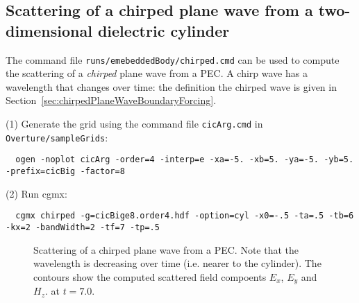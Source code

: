 \clearpage
\subsection{Scattering of a chirped plane wave from a two-dimensional dielectric cylinder} \label{sec:cyl2dDielectricScatChirped}

The command file {\tt runs/emebeddedBody/chirped.cmd} can be used to compute the scattering
of a {\em chirped} plane wave from a PEC. 
A chirp wave has a wavelength that changes over time: 
the definition the chirped wave is given in Section~\ref{sec:chirpedPlaneWaveBoundaryForcing}.


\noindent (1) Generate the grid using the command file {\tt cicArg.cmd} in {\tt Overture/sampleGrids}:
{\small
\begin{verbatim}
  ogen -noplot cicArg -order=4 -interp=e -xa=-5. -xb=5. -ya=-5. -yb=5. -prefix=cicBig -factor=8
\end{verbatim}
}
\noindent (2) Run cgmx: 
{\small
\begin{verbatim}
  cgmx chirped -g=cicBige8.order4.hdf -option=cyl -x0=-.5 -ta=.5 -tb=6 -kx=2 -bandWidth=2 -tf=7 -tp=.5
\end{verbatim}
}

{
\begin{figure}[hbt]
\newcommand{\figWidth}{5.5cm}
\newcommand{\trimfig}[2]{\trimFig{#1}{#2}{0.1}{0.05}{.05}{.05}}
\begin{center}
\end{center}
\caption{Scattering of a chirped plane wave from a PEC. Note that the wavelength is decreasing over time (i.e. nearer to the cylinder).
The contours show the computed scattered field compoents $E_x$, $E_y$ and $H_z$. at $t=7.0$.}
\label{fig:cyl2dDielectricScatChirped}
\end{figure}
}

